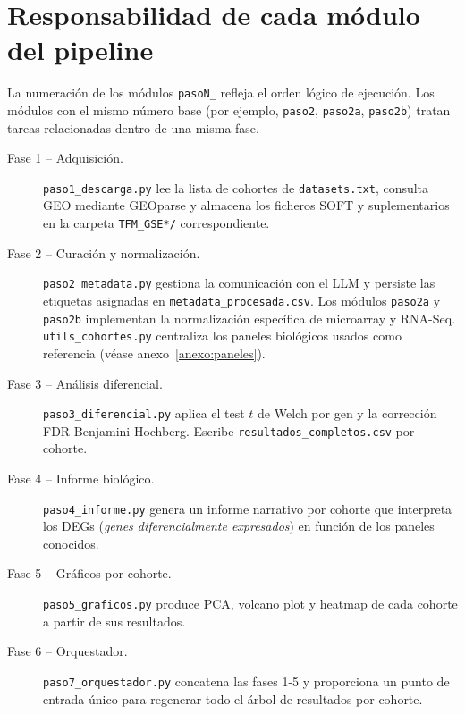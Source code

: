 \section*{Responsabilidad de cada módulo del pipeline}
{}

La numeración de los módulos \texttt{pasoN\_} refleja el orden lógico de
ejecución. Los módulos con el mismo número base (por ejemplo,
\texttt{paso2}, \texttt{paso2a}, \texttt{paso2b}) tratan tareas
relacionadas dentro de una misma fase.

\begin{description}
  \item[Fase 1 -- Adquisición.] \texttt{paso1\_descarga.py} lee la lista
  de cohortes de \texttt{datasets.txt}, consulta GEO mediante GEOparse y
  almacena los ficheros SOFT y suplementarios en la carpeta
  \texttt{TFM\_GSE*/} correspondiente.

  \item[Fase 2 -- Curación y normalización.] \texttt{paso2\_metadata.py}
  gestiona la comunicación con el LLM y persiste las etiquetas asignadas
  en \texttt{metadata\_procesada.csv}. Los módulos \texttt{paso2a} y
  \texttt{paso2b} implementan la normalización específica de microarray y
  RNA-Seq. \texttt{utils\_cohortes.py} centraliza los paneles biológicos
  usados como referencia (véase anexo~\ref{anexo:paneles}).

  \item[Fase 3 -- Análisis diferencial.] \texttt{paso3\_diferencial.py}
  aplica el test $t$ de Welch por gen y la corrección FDR
  Benjamini-Hochberg. Escribe \texttt{resultados\_completos.csv} por
  cohorte.

  \item[Fase 4 -- Informe biológico.] \texttt{paso4\_informe.py} genera
  un informe narrativo por cohorte que interpreta los DEGs (\emph{genes
  diferencialmente expresados}) en función de los paneles conocidos.

  \item[Fase 5 -- Gráficos por cohorte.] \texttt{paso5\_graficos.py}
  produce PCA, volcano plot y heatmap de cada cohorte a partir de sus
  resultados.

  \item[Fase 6 -- Orquestador.] \texttt{paso7\_orquestador.py} concatena
  las fases 1-5 y proporciona un punto de entrada único para regenerar
  todo el árbol de resultados por cohorte.


\end{description}
